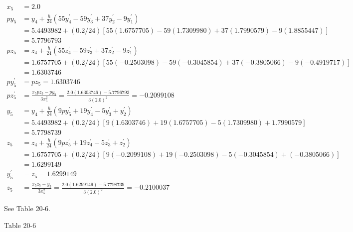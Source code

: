 \documentclass[10pt]{article}
\begin{document}
$$
\begin{aligned}
x_{5} & =2.0 \\
p y_{5} & =y_{4}+\frac{h}{24}\left(55 y_{4}^{\prime}-59 y_{3}^{\prime}+37 y_{2}^{\prime}-9 y_{1}^{\prime}\right) \\
& =5.4493982+(0.2 / 24)[55(1.6757705)-59(1.7309980)+37(1.7990579)-9(1.8855447)] \\
& =5.7796793 \\
p z_{5} & =z_{4}+\frac{h}{24}\left(55 z_{4}^{\prime}-59 z_{3}^{\prime}+37 z_{2}^{\prime}-9 z_{1}^{\prime}\right) \\
& =1.6757705+(0.2 / 24)[55(-0.2503098)-59(-0.3045854)+37(-0.3805066)-9(-0.4919717)] \\
& =1.6303746 \\
p y_{5}^{\prime} & =p z_{5}=1.6303746 \\
p z_{5}^{\prime} & =\frac{x_{5} p z_{5}-p y_{5}}{3 x_{5}^{2}}=\frac{2.0(1.6303746)-5.7796793}{3(2.0)^{2}}=-0.2099108 \\
y_{5} & =y_{4}+\frac{h}{24}\left(9 p y_{5}^{\prime}+19 y_{4}^{\prime}-5 y_{3}^{\prime}+y_{2}^{\prime}\right) \\
& =5.4493982+(0.2 / 24)[9(1.6303746)+19(1.6757705)-5(1.7309980)+1.7990579] \\
& =5.7798739 \\
z_{5} & =z_{4}+\frac{h}{24}\left(9 p z_{5}^{\prime}+19 z_{4}^{\prime}-5 z_{3}^{\prime}+z_{2}^{\prime}\right) \\
& =1.6757705+(0.2 / 24)[9(-0.2099108)+19(-0.2503098)-5(-0.3045854)+(-0.3805066)] \\
& =1.6299149 \\
y_{5}^{\prime} & =z_{5}=1.6299149 \\
z_{5} & =\frac{x_{5} z_{5}-y_{5}}{3 x_{5}^{2}}=\frac{2.0(1.6299149)-5.7798739}{3(2.0)^{2}}=-0.2100037
\end{aligned}
$$

See Table 20-6.

Table 20-6
\end{document}
